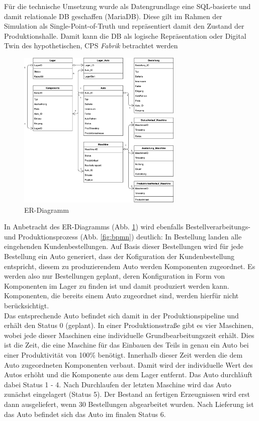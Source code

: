 Für die technische Umsetzung wurde als Datengrundlage eine SQL-basierte und damit relationale \ac{DB} geschaffen (MariaDB). Diese gilt im Rahmen der Simulation als Single-Point-of-Truth und repräsentiert damit den Zustand der Produktionshalle. Damit kann die \ac{DB} als logische Repräsentation oder Digital Twin des hypothetischen, \ac{CPS} \textit{Fabrik} betrachtet werden
\begin{figure}[H]
    \centering
    \includegraphics[width=0.7\textwidth]{ausarbeitung-latex/img/ER-Diagramm.png}
    \caption{ER-Diagramm}
    \label{fig:er}
\end{figure}
In Anbetracht des ER-Diagramms (Abb. \ref{fig:er}) wird ebenfalls Bestellverarbeitungs- und Produktionsprozess (Abb. \ref{fig:bpmn}) deutlich: In Bestellung landen alle eingehenden Kundenbestellungen. Auf Basis dieser Bestellungen wird für jede Bestellung ein Auto generiert, dass der Kofiguration der Kundenbestellung entspricht, diesem zu produzierendem Auto werden Komponenten zugeordnet. Es werden also nur Bestellungen geplant, deren Konfiguration in Form von Komponenten im Lager zu finden ist und damit produziert werden kann. Komponenten, die bereits einem Auto zugeordnet sind, werden hierfür nicht berücksichtigt.
\\Das entsprechende Auto befindet sich damit in der Produktionspipeline und erhält den Status 0 (geplant).
In einer Produktionsstraße gibt es vier Maschinen, wobei jede dieser Maschinen eine individuelle Grundbearbeitungszeit erhält. Dies ist die Zeit, die eine Maschine für das Einbauen des Teils in genau ein Auto bei einer Produktivität von 100\% benötigt. Innerhalb dieser Zeit werden die dem Auto zugeordneten Komponenten verbaut. Damit wird der individuelle Wert des Autos erhöht und die Komponente aus dem Lager entfernt. Das Auto durchläuft dabei Status 1 - 4. Nach Durchlaufen der letzten Maschine wird das Auto zunächst eingelagert (Status 5). Der Bestand an fertigen Erzeugnissen wird erst dann ausgeliefert, wenn 30 Bestellungen abgearbeitet wurden. Nach Lieferung ist das Auto befindet sich das Auto im finalen Status 6.
